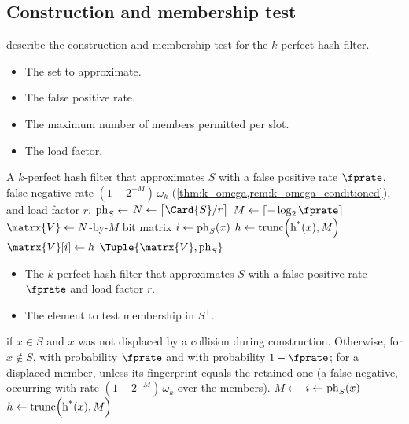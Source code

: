\documentclass[ ../main.tex]{subfiles}
\begin{document}
\subsection{Construction and membership test}
 describe the construction and membership test for the $k$-perfect hash filter.
\begin{algorithm}[h]
    \caption{Construction of the $k$-perfect hash filter}
    \label{alg:k_PHF}
    \KwIn
    {
        \begin{itemize}
            \item[$S$] The set to approximate.
            \item[$\fprate$] The false positive rate.
            \item[$k$] The maximum number of members permitted per slot.
            \item[$r$] The load factor.
        \end{itemize}
    }
    \KwOut
    {
        A $k$-perfect hash filter that approximates $S$ with a false positive rate $\fprate$, false negative rate $(1-2^{-M})\,\omega_k$ (\cref{thm:k_omega,rem:k_omega_conditioned}), and load factor $r$.
    }
    {
        $\operatorname{ph}_{S} \gets$ 
        $N \gets \left\lceil \Card{S} / r \right\rceil$\;
        $M \gets \left\lceil -\log_2 \fprate \right\rceil$\;
        $\matrx{V} \gets N$-by-$M$ bit matrix\;
        {
            $i \gets \operatorname{ph}_{S}(x)$\;
            $h \gets \operatorname{trunc}\!\left(\operatorname{h^*}(x), M\right)$\;
            $\matrx{V}[i] \gets h$
        }
        \Return $\Tuple{\matrx{V}, \ph_{S}}$\;
    }
\end{algorithm}
\begin{algorithm}[h]
    \caption{Membership test for the $k$-perfect hash filter}
    \label{alg:k_PHF_has}
    \KwIn
    {
        \begin{itemize}
            \item[$S^+$] The $k$-perfect hash filter that approximates $S$ with a false positive rate $\fprate$ and load factor $r$.
            \item[$x$] The element to test membership in $S^+$.
        \end{itemize}
    }
    \KwOut
    {
        \True if $x \in S$ and $x$ was not displaced by a collision during construction. Otherwise, for $x \notin S$, \True with probability $\fprate$ and \False with probability $1 - \fprate$; for a displaced member, \False unless its fingerprint equals the retained one (a false negative, occurring with rate $(1-2^{-M})\,\omega_k$ over the members).
    }
    {
        $M \gets$ \;
        $i \gets \operatorname{ph}_{S}(x)$\;
        $h \gets \operatorname{trunc}\!\left(\operatorname{h^*}(x), M\right)$\;
        \;
    }
\end{algorithm}
\end{document}
